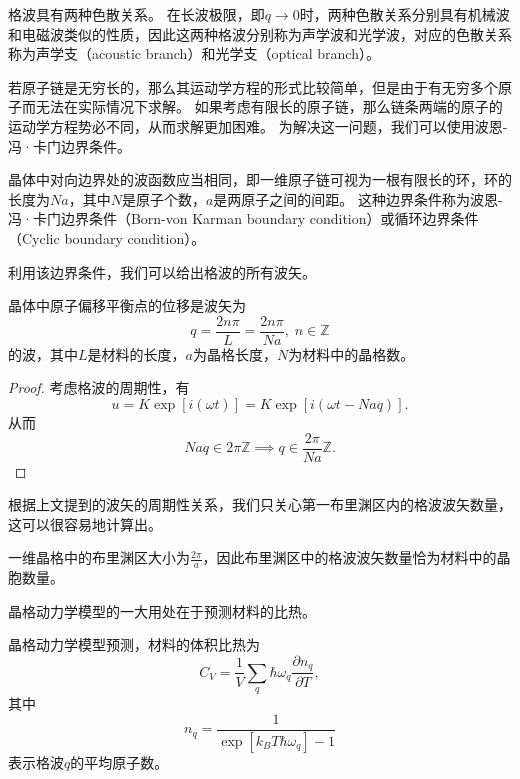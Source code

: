 格波具有两种色散关系。
在长波极限，即$q \to 0$时，两种色散关系分别具有机械波和电磁波类似的性质，因此这两种格波分别称为声学波和光学波，对应的色散关系称为声学支（acoustic branch）和光学支（optical branch）。

若原子链是无穷长的，那么其运动学方程的形式比较简单，但是由于有无穷多个原子而无法在实际情况下求解。
如果考虑有限长的原子链，那么链条两端的原子的运动学方程势必不同，从而求解更加困难。
为解决这一问题，我们可以使用波恩-冯·卡门边界条件。

\begin{proposition}
    晶体中对向边界处的波函数应当相同，即一维原子链可视为一根有限长的环，环的长度为$Na$，其中$N$是原子个数，$a$是两原子之间的间距。
    这种边界条件称为波恩-冯·卡门边界条件（Born-von Karman boundary condition）或循环边界条件（Cyclic boundary condition）。
\end{proposition}
利用该边界条件，我们可以给出格波的所有波矢。
\begin{proposition}
    晶体中原子偏移平衡点的位移是波矢为
    \begin{equation}q = \frac{2n\pi}{L} = \frac{2n\pi}{Na}, \; n \in \mathbb Z\end{equation}
    的波，其中$L$是材料的长度，$a$为晶格长度，$N$为材料中的晶格数。
\end{proposition}

\begin{proof}\small
    考虑格波的周期性，有
    \begin{equation}
        u = K \exp[i(\omega t)] = K \exp[i(\omega t - N a q)].
    \end{equation}
    从而
    \begin{equation}
        N a q \in 2 \pi \mathbb Z \implies q \in \frac{2\pi}{Na} \mathbb Z.
    \end{equation}
\end{proof}

根据上文提到的波矢的周期性关系，我们只关心第一布里渊区内的格波波矢数量，这可以很容易地计算出。
\begin{corollary}
    一维晶格中的布里渊区大小为$\frac{2\pi}{a}$，因此布里渊区中的格波波矢数量恰为材料中的晶胞数量。
\end{corollary}

晶格动力学模型的一大用处在于预测材料的比热。
\begin{proposition}
    晶格动力学模型预测，材料的体积比热为
    \begin{equation}
        C_V = \frac{1}{V} \sum_q \hbar \omega_q \frac{\partial n_q}{\partial T},
    \end{equation}
    其中
    \begin{equation}
        n_q = \frac{1}{\exp[k_B T \hbar \omega_q ] - 1}
    \end{equation}
    表示格波$q$的平均原子数。
\end{proposition}

